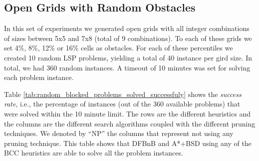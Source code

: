 \documentclass[letterpaper]{article} %
\begin{document}
\subsection{Open Grids with Random Obstacles}

In this set of experiments we generated open grids with all integer combinations of sizes between 5x5 and 7x8 (total of 9 combinations). To each of these grids we set 4\%, 8\%, 12\% or 16\% cells as obstacles. For each of these percentiles we created 10 random LSP problems, yielding a total of 40 instance per gird size. In total, we had 360 random instances. A timeout of 10 minutes was set for solving each problem instance. %



Table \ref{tab:random_blocked_problems_solved_successfuly} shows the \emph{success rate}, i.e., the percentage of instances (out of the 360 available problems) that were solved within the 10 minute limit. The rows are the different heuristics and the columns are the different search algorithms coupled with the different pruning techniques. 
We denoted by ``NP'' the columns that represent not using any pruning technique. This table shows that DFBnB
and A*+BSD using any of the BCC heuristics are able to solve all the problem instances. 
\end{document}
